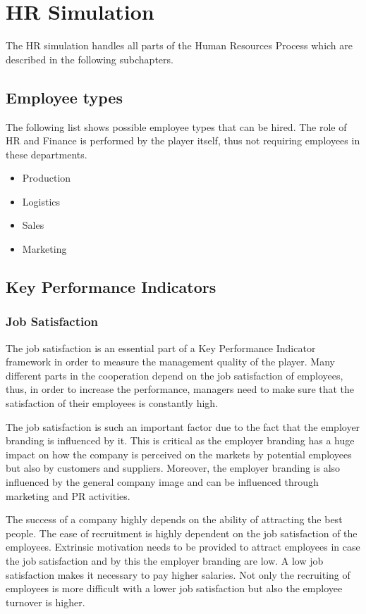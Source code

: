 \section{HR Simulation}
The HR simulation handles all parts of the Human Resources Process which are described in the following subchapters.
\subsection{Employee types}
The following list shows possible employee types that can be hired. The role of HR and Finance is performed by the player itself, thus not requiring employees in these departments.
\begin{itemize}
    \item Production
    \item Logistics
    \item Sales
    \item Marketing
\end{itemize}



\subsection{Key Performance Indicators}
\subsubsection{Job Satisfaction}
The job satisfaction is an essential part of a Key Performance Indicator framework in order to measure the management quality of the player. Many different parts in the cooperation depend on the job satisfaction of employees, thus, in order to increase the performance, managers need to make sure that the satisfaction of their employees is constantly high.\cite{KOYS}

The job satisfaction is such an important factor due to the fact that the employer branding is influenced by it. This is critical as the employer branding has a huge impact on how the company is perceived on the markets by potential employees but also by customers and suppliers. Moreover, the employer branding is also influenced by the general company image and can be influenced through marketing and PR activities. 

The success of a company highly depends on the ability of attracting the best people. The ease of recruitment is highly dependent on the job satisfaction of the employees. Extrinsic motivation needs to be provided to attract employees in case the job satisfaction and by this the employer branding are low. A low job satisfaction makes it necessary to pay higher salaries. Not only the recruiting of employees is more difficult with a lower job satisfaction but also the employee turnover is higher. \cite{frederiksen2016}

